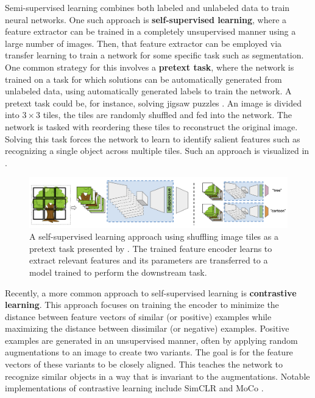 Semi-supervised learning combines both labeled and unlabeled data to train neural networks. One such approach is \textbf{self-supervised learning}, where a feature extractor can be trained in a completely unsupervised manner using a large number of images. Then, that feature extractor can be employed via transfer learning to train a network for some specific task such as segmentation. One common strategy for this involves a \textbf{pretext task}, where the network is trained on a task for which solutions can be automatically generated from unlabeled data, using automatically generated labels to train the network. A pretext task could be, for instance, solving jigsaw puzzles \cite{norooziUnsupervisedLearningVisual2016}. An image is divided into $3 \times 3$ tiles, the tiles are randomly shuffled and fed into the network. The network is tasked with reordering these tiles to reconstruct the original image. Solving this task forces the network to learn to identify salient features such as recognizing a single object across multiple tiles. Such an approach is visualized in .

\begin{figure}[b!]
 \centering
 \includegraphics[width=\linewidth]{images/3/shuffle-to-learn}
 \caption{A self-supervised learning approach using shuffling image tiles as a pretext task presented by \citet{carr2021shuffle}. The trained feature encoder learns to extract relevant features and its parameters are transferred to a model trained to perform the downstream task.}
 \label{fig:ssl-pretext}
\end{figure}

Recently, a more common approach to self-supervised learning is \textbf{contrastive learning}.
This approach focuses on training the encoder to minimize the distance between feature vectors of similar (or positive) examples while maximizing the distance between dissimilar (or negative) examples. Positive examples are generated in an unsupervised manner, often by applying random augmentations to an image to create two variants.  The goal is for the feature vectors of these variants to be closely aligned. This teaches the network to recognize similar objects in a way that is invariant to the augmentations. Notable implementations of contrastive learning include SimCLR \cite{chenSimpleFrameworkContrastive2020} and MoCo \cite{he2019moco}.

